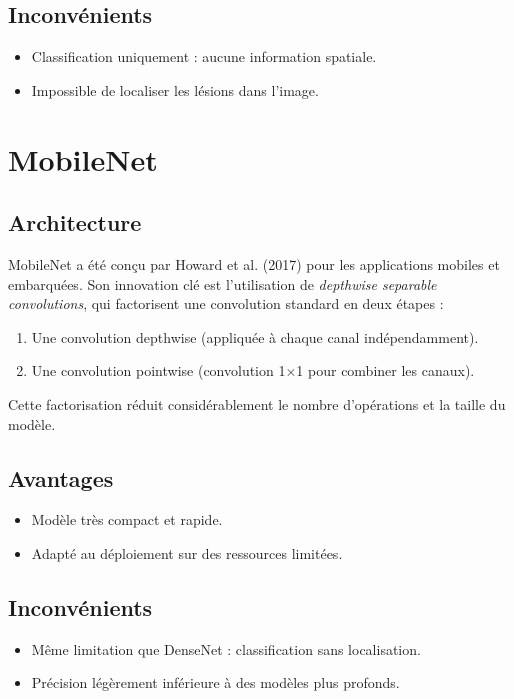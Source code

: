 \documentclass[12pt,a4paper,twoside]{report}
\begin{document}
\subsection{Inconvénients}
\begin{itemize}
  \item Classification uniquement : aucune information spatiale.
  \item Impossible de localiser les lésions dans l'image.
\end{itemize}

\section{MobileNet}

\subsection{Architecture}

MobileNet \cite{mobilenet} a été conçu par Howard et al. (2017) pour les applications mobiles et embarquées. Son innovation clé est l'utilisation de \textit{depthwise separable convolutions}, qui factorisent une convolution standard en deux étapes :
\begin{enumerate}
  \item Une convolution depthwise (appliquée à chaque canal indépendamment).
  \item Une convolution pointwise (convolution 1$\times$1 pour combiner les canaux).
\end{enumerate}

Cette factorisation réduit considérablement le nombre d'opérations et la taille du modèle.

\subsection{Avantages}
\begin{itemize}
  \item Modèle très compact et rapide.
  \item Adapté au déploiement sur des ressources limitées.
\end{itemize}

\subsection{Inconvénients}
\begin{itemize}
  \item Même limitation que DenseNet : classification sans localisation.
  \item Précision légèrement inférieure à des modèles plus profonds.
\end{itemize}
\end{document}
